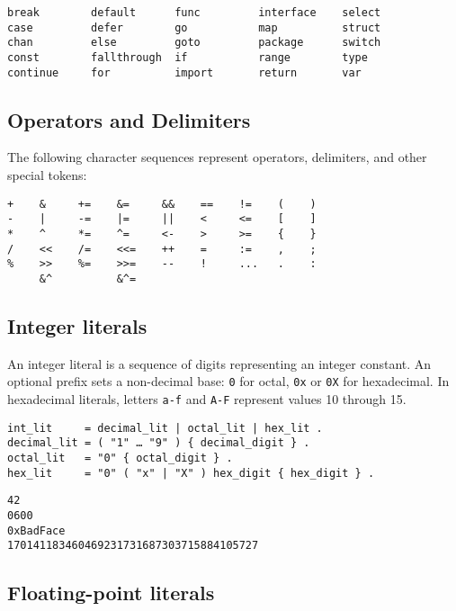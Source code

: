 \begin{Verbatim}[frame=single]
break        default      func         interface    select
case         defer        go           map          struct
chan         else         goto         package      switch
const        fallthrough  if           range        type
continue     for          import       return       var
\end{Verbatim}

\subsection*{Operators and Delimiters}

The following character sequences represent
operators, delimiters, and other special tokens:

\begin{Verbatim}[frame=single]
+    &     +=    &=     &&    ==    !=    (    )
-    |     -=    |=     ||    <     <=    [    ]
*    ^     *=    ^=     <-    >     >=    {    }
/    <<    /=    <<=    ++    =     :=    ,    ;
%    >>    %=    >>=    --    !     ...   .    :
     &^          &^=
\end{Verbatim}

\subsection*{Integer literals}

An integer literal is a sequence of digits representing an
integer constant. An optional prefix sets a
non-decimal base: \texttt{0} for octal, \texttt{0x} or \texttt{0X} for
hexadecimal. In hexadecimal literals, letters \texttt{a-f} and
\texttt{A-F} represent values 10 through 15.

\begin{Verbatim}[frame=single]
int_lit     = decimal_lit | octal_lit | hex_lit .
decimal_lit = ( "1" … "9" ) { decimal_digit } .
octal_lit   = "0" { octal_digit } .
hex_lit     = "0" ( "x" | "X" ) hex_digit { hex_digit } .
\end{Verbatim}

\begin{Verbatim}[frame=single]
42
0600
0xBadFace
170141183460469231731687303715884105727
\end{Verbatim}

\subsection*{Floating-point literals}

